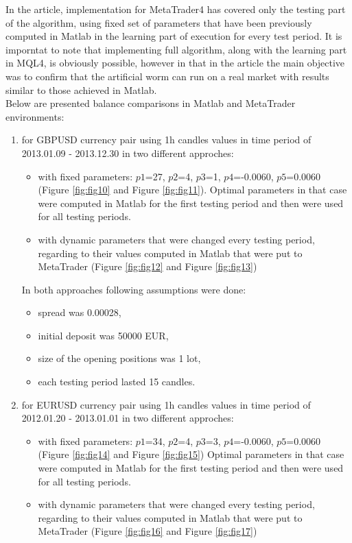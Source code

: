 \documentclass[runningheads,a4paper]{llncs}
\begin{document}
In the article, implementation for MetaTrader4 has covered only the testing part of the algorithm, using fixed set of parameters that have been previously computed in Matlab in the learning part of execution for every test period. It is imporntat to note that implementing full algorithm, along with the learning part in MQL4, is obviously possible, however in that in the article the main objective was to confirm that the artificial worm can run on a real market with results similar to those achieved in Matlab.\\

Below are presented balance comparisons in Matlab and MetaTrader environments:
\begin{enumerate}
\item for GBPUSD currency pair using 1h candles values in time period of 2013.01.09 - 2013.12.30 in two different approches:
\begin{itemize}
\item with fixed parameters: $p1$=27, $p2$=4, $p3$=1, $p4$=-0.0060, $p5$=0.0060 (Figure \ref{fig:fig10} and Figure \ref{fig:fig11}). Optimal parameters in that case were computed in Matlab for the first testing period and then were used for all testing periods.
\item with dynamic parameters that were changed every testing period, regarding to their values computed in Matlab that were put to MetaTrader (Figure \ref{fig:fig12} and Figure \ref{fig:fig13})
\end{itemize}
In both approaches following assumptions were done:
\begin{itemize}
\item spread was 0.00028, 
\item initial deposit was 50000 EUR,
\item size of the opening positions was 1 lot,
\item each testing period lasted 15 candles.
\end{itemize}
\item for EURUSD currency pair using 1h candles values in time period of 2012.01.20 - 2013.01.01 in two different approches:
\begin{itemize}
\item with fixed parameters: $p1$=34, $p2$=4, $p3$=3, $p4$=-0.0060, $p5$=0.0060 (Figure \ref{fig:fig14} and Figure \ref{fig:fig15}) Optimal parameters in that case were computed in Matlab for the first testing period and then were used for all testing periods.
\item with dynamic parameters that were changed every testing period, regarding to their values computed in Matlab that were put to MetaTrader (Figure \ref{fig:fig16} and Figure \ref{fig:fig17})

\end{itemize}
\end{enumerate}
\end{document}
